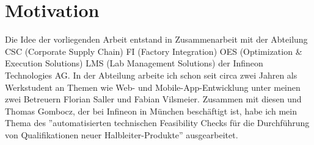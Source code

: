 \section{Motivation}
Die Idee der vorliegenden Arbeit entstand in Zusammenarbeit mit der Abteilung CSC (Corporate Supply Chain) FI (Factory Integration) OES (Optimization \& Execution Solutions) LMS (Lab Management Solutions) der Infineon Technologies AG. 
In der Abteilung arbeite ich schon seit circa zwei Jahren als Werkstudent an Themen wie Web- und Mobile-App-Entwicklung unter meinen zwei Betreuern Florian Saller und Fabian Vilsmeier.
Zusammen mit diesen und Thomas Gombocz, der bei Infineon in München beschäftigt ist, habe ich mein Thema des ''automatisierten technischen Feasibility Checks für die Durchführung von Qualifikationen neuer Halbleiter-Produkte'' ausgearbeitet.